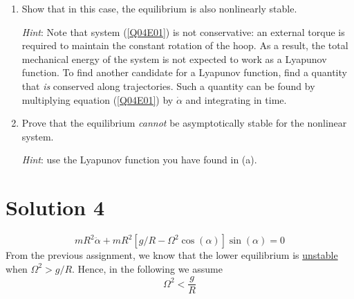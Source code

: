 \documentclass[twoside,10pt,a4paper]{article}
\begin{document}
\begin{enumerate}[label=(\alph*)]
	\item Show that in this case, the equilibrium is also nonlinearly stable. 
	
	\textit{Hint}: Note that system (\ref{Q04E01}) is not conservative: an external torque is required to maintain the constant rotation of the hoop. As a result, the total mechanical energy of the system is not expected to work as a Lyapunov function. To find another candidate for a Lyapunov function, find a quantity that \textit{is} conserved along trajectories. Such a quantity can be found by multiplying equation (\ref{Q04E01}) by $\dot{\alpha}$ and integrating in time.
	\item Prove that the equilibrium \textit{cannot} be asymptotically stable for the nonlinear system.
	
	\textit{Hint}: use the Lyapunov function you have found in (a).
\end{enumerate}

\section*{Solution 4}
\begin{equation*}
	mR^2\ddot{\alpha} + mR^2[g/R - \Omega^2 \cos(\alpha)]\sin(\alpha) = 0
\end{equation*}
From the previous assignment, we know that the lower equilibrium is \underline{unstable} when $\Omega^2 > g/R$. Hence, in the following we assume
\begin{equation}\label{S03E021}
	\Omega^2 < \frac{g}{R}
\end{equation}
\end{document}
